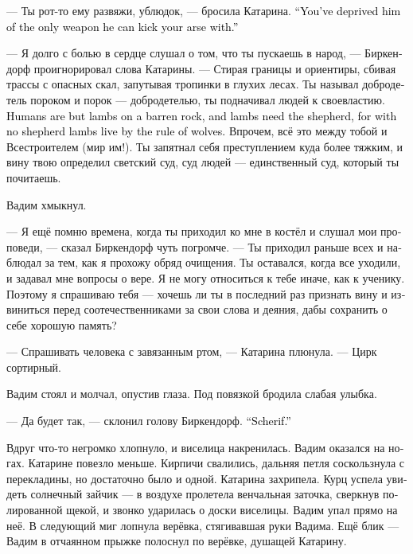 \documentclass[a4paper,12pt,fleqn]{book}\usepackage{cooltooltips}\usepackage{polyglossia}\setdefaultlanguage[babelshorthands=true]{russian}\setotherlanguage{english}\defaultfontfeatures{Ligatures=TeX,Mapping=tex-text} \usepackage{xcolor}\definecolor{lightgray}{HTML}{bbbbbb}\color{lightgray}\newcommand{\ml}[3]{\textenglish{\textcolor{black}{#3}}}
\newcommand{\textspace}{\vspace{1em}{\centering\Large\bfseries<...>\par}\vspace{1em}}
\begin{document}
--- Ты рот-то ему развяжи, ублюдок, --- бросила Катарина.
\ml{$0$}
{--- Ты его лишил единственного оружия, которым он может надрать тебе зад.}
{``You've deprived him of the only weapon he can kick your arse with.''}

--- Я долго с болью в сердце слушал о том, что ты пускаешь в народ, --- Биркендорф проигнорировал слова Катарины.
--- Стирая границы и ориентиры, сбивая трассы с опасных скал, запутывая тропинки в глухих лесах.
Ты называл добродетель пороком и порок --- добродетелью, ты подначивал людей к своевластию.
\ml{$0$}
{Люди суть агнцы на бесплодной скале, и агнцам нужен пастырь, ибо без пастыря агнцы живут по законам волков.}
{Humans are but lambs on a barren rock, and lambs need the shepherd, for with no shepherd lambs live by the rule of wolves.}
Впрочем, всё это между тобой и Всестроителем (мир им!).
Ты запятнал себя преступлением куда более тяжким, и вину твою определил светский суд, суд людей --- единственный суд, который ты почитаешь.

Вадим хмыкнул.

--- Я ещё помню времена, когда ты приходил ко мне в костёл и слушал мои проповеди, --- сказал Биркендорф чуть погромче.
--- Ты приходил раньше всех и наблюдал за тем, как я прохожу обряд очищения.
Ты оставался, когда все уходили, и задавал мне вопросы о вере.
Я не могу относиться к тебе иначе, как к ученику.
Поэтому я спрашиваю тебя --- хочешь ли ты в последний раз признать вину и извиниться перед соотечественниками за свои слова и деяния, дабы сохранить о себе хорошую память?

--- Спрашивать человека с завязанным ртом, --- Катарина плюнула.
--- Цирк сортирный.

Вадим стоял и молчал, опустив глаза.
Под повязкой бродила слабая улыбка.

--- Да будет так, --- склонил голову Биркендорф.
\ml{$0$}
{--- Шериф.}
{``Scherif.''}

\textspace

Вдруг что-то негромко хлопнуло, и виселица накренилась.
Вадим оказался на ногах.
Катарине повезло меньше.
Кирпичи свалились, дальняя петля соскользнула с перекладины, но достаточно было и одной.
Катарина захрипела.
Курц успела увидеть солнечный зайчик --- в воздухе пролетела венчальная заточка, сверкнув полированной щекой, и звонко ударилась о доски виселицы.
Вадим упал прямо на неё.
В следующий миг лопнула верёвка, стягивавшая руки Вадима.
Ещё блик --- Вадим в отчаянном прыжке полоснул по верёвке, душащей Катарину.
\end{document}
